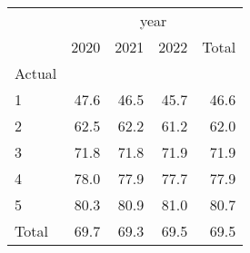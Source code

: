 \documentclass{article}
\begin{document}
\begin{minipage}[b]{.40\textwidth}
	\centering
\begin{tabular}{lllll}
	\cline{1-5}
	\multicolumn{1}{c}{} &
	\multicolumn{4}{|c}{year} \\
	\multicolumn{1}{c}{} &
	\multicolumn{1}{|r}{2020} &
	\multicolumn{1}{r}{2021} &
	\multicolumn{1}{r}{2022} &
	\multicolumn{1}{r}{Total} \\
	\cline{1-5}
	\multicolumn{1}{l}{Actual} &
	\multicolumn{1}{|r}{} &
	\multicolumn{1}{r}{} &
	\multicolumn{1}{r}{} &
	\multicolumn{1}{r}{} \\
	\multicolumn{1}{l}{\hspace{1em}1} &
	\multicolumn{1}{|r}{47.6} &
	\multicolumn{1}{r}{46.5} &
	\multicolumn{1}{r}{45.7} &
	\multicolumn{1}{r}{46.6} \\
	\multicolumn{1}{l}{\hspace{1em}2} &
	\multicolumn{1}{|r}{62.5} &
	\multicolumn{1}{r}{62.2} &
	\multicolumn{1}{r}{61.2} &
	\multicolumn{1}{r}{62.0} \\
	\multicolumn{1}{l}{\hspace{1em}3} &
	\multicolumn{1}{|r}{71.8} &
	\multicolumn{1}{r}{71.8} &
	\multicolumn{1}{r}{71.9} &
	\multicolumn{1}{r}{71.9} \\
	\multicolumn{1}{l}{\hspace{1em}4} &
	\multicolumn{1}{|r}{78.0} &
	\multicolumn{1}{r}{77.9} &
	\multicolumn{1}{r}{77.7} &
	\multicolumn{1}{r}{77.9} \\
	\multicolumn{1}{l}{\hspace{1em}5} &
	\multicolumn{1}{|r}{80.3} &
	\multicolumn{1}{r}{80.9} &
	\multicolumn{1}{r}{81.0} &
	\multicolumn{1}{r}{80.7} \\
	\multicolumn{1}{l}{\hspace{1em}Total} &
	\multicolumn{1}{|r}{69.7} &
	\multicolumn{1}{r}{69.3} &
	\multicolumn{1}{r}{69.5} &
	\multicolumn{1}{r}{69.5} \\
	\cline{1-5}
\end{tabular}
\end{minipage}\qquad
\end{document}
